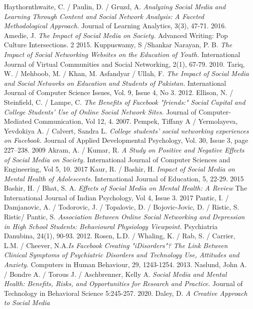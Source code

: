 \documentclass[lettersize,journal]{IEEEtran}
\begin{document}
\begin{thebibliography}{}
    Haythornthwaite, C. / Paulin, D. / Gruzd, A. {\it{Analyzing Social Media
        and Learning Through Content and Social Network Analysis: A Faceted
        Methodological Approach.}} Journal of Learning Analytics, 3(3), 47-71.
        2016.
        Amedie, J. {\it{The Impact of Social Media on Society.}}
        Advanced Writing: Pop Culture Intersections. 2
        2015.
	Kuppuswamy, S /Shankar Narayan, P. B. {\it{The Impact of Social Networking Websites on the Education of Youth.}}
	International Journal of Virtual Communities and Social Networking, 2(1), 67-79.
	2010.
	Tariq, W. / Mehboob, M. / Khan, M. Asfandyar / Ullah, F. {\it{The Impact of Social Media and Social Networks on Education and Students of Pakistan.}} International Journal of Computer Science Issues, Vol. 9, Issue 4, No 3.
	2012.
	Ellison, N. / Steinfield, C. / Lampe, C. {\it{The Benefits of Facebook "friends:" Social Capital and College Students' Use of Online Social Network Sites.}} Journal of Computer-Mediated Communication, Vol 12, 4.
	2007.
	Pempek, Tiffany A / Yermolayeva, Yevdokiya A. / Calvert, Sandra L. {\it{College students’ social networking experiences on
		Facebook.}} Journal of Applied Developmental Psychology, Vol. 30, Issue 3, page 227–238.
	2009
	Akram, A. / Kumar, R. {\it{A Study on Positive and Negative Effects of Social Media on Society.}}
	International Journal of Computer Sciences and Engineering, Vol 5, 10.
	2017
	Kaur, R. / Bashir, H. {\it{Impact of Social Media on Mental Health of Adolescents.}}
	International Journal of Education, 5, 22-29.
	2015
	Bashir, H. / Bhat, S. A. {\it{Effects of Social Media on Mental Health: A Review}}
	The International Journal of Indian Psychology, Vol 4, Issue 3.
	2017
	Pantic, I. / Damjanovic, A. / Todorovic, J. / Topalovic, D. / Bojovic-Jovic, D. / Ristic, S. Ristic/ Pantic, S.
	{\it{Association Between Online Social Networking and Depression in High School Students: Behavioural Physiology Viewpoint.}}
	Psychiatria Danubina, 24(1), 90-93.
	2012.
	Rosen, L.D. / Whaling, K. / Rab, S. / Carrier, L.M. / Cheever, N.A.{\it{Is Facebook Creating "iDisorders"? The Link Between Clinical Symptoms of Psychiatric Disorders and Technology Use, Attitudes and Anxiety.}} Computers in Human Behaviour, 29, 1243-1254.
	2013.
	Naslund, John A. / Bondre A. / Torous J. / Aschbrenner, Kelly A. {\it{Social Media and Mental Health: Benefits, Risks, and Opportunities for Research and Practice.}} Journal of Technology in Behavioral Science 5:245-257.
	2020.
	Daley, D. {\it{A Creative Approach to Social Media}} 
\end{thebibliography}
\newpage
\newpage
\end{document}
